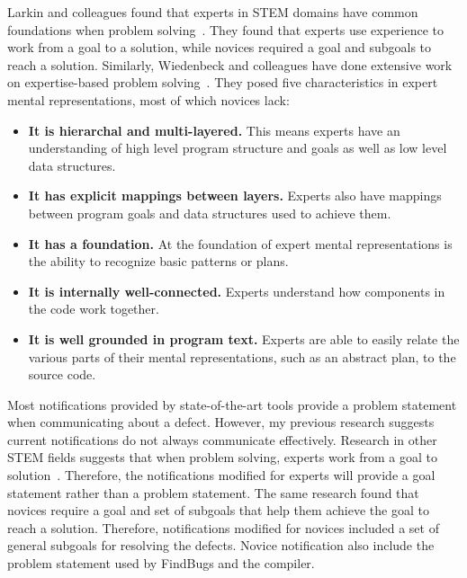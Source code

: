 Larkin and colleagues found that experts in STEM domains have common foundations when problem solving~\cite{larkin1980expert}. They found that experts use experience to work from a goal to a solution, while novices required a goal and subgoals to reach a solution. Similarly, Wiedenbeck and colleagues have done extensive work on expertise-based problem solving~\cite{wiedenbeck1985novice,Wiedenbeck:1993:Mental}. They posed five characteristics in expert mental representations, most of which novices lack:

\begin{itemize}
    \item \textbf{It is hierarchal and multi-layered.} This means experts have an understanding of high level program structure and goals as well as low level data structures.
    \item \textbf{It has explicit mappings between layers.} Experts also have mappings between program goals and data structures used to achieve them.
    \item \textbf{It has a foundation.} At the foundation of expert mental representations is the ability to recognize basic patterns or plans.
    \item \textbf{It is internally well-connected.} Experts understand how components in the code work together.
    \item \textbf{It is well grounded in program text.} Experts are able to easily relate the various parts of their mental representations, such as an abstract plan, to the source code.   
\end{itemize}


Most notifications provided by state-of-the-art tools provide a problem statement when communicating about a defect. However, my previous research suggests current notifications do not always communicate effectively.
Research in other STEM fields suggests that when problem solving, experts work from a goal to solution~\cite{larkin1980expert}. Therefore, the notifications modified for experts will provide a goal statement rather than a problem statement. The same research found that novices require a goal and set of subgoals that help them achieve the goal to reach a solution. Therefore, notifications modified for novices included a set of general subgoals for resolving the defects. Novice notification also include the problem statement used by FindBugs and the compiler.

